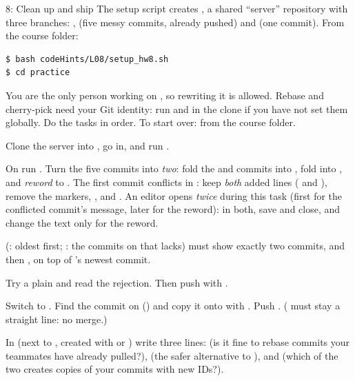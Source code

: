 \begin{homework}{8: Clean up and ship}
The setup script creates , a shared ``server'' repository with three branches: ,  (five messy commits, already pushed) and  (one commit). From the course folder:
\begin{lstlisting}
$ bash codeHints/L08/setup_hw8.sh
$ cd practice
\end{lstlisting}
You are the only person working on , so rewriting it is allowed. Rebase and cherry-pick need your Git identity: run  and  in the clone if you have not set them globally. Do the tasks in order. To start over:  from the course folder.

\begin{description}[leftmargin=1.2em,style=nextline]
\item[8.1 Look] Clone the server into , go in, and run .
\item[8.2 Tidy and rebase] On  run . Turn the five commits into \emph{two}: fold the  and  commits into , fold  into , and \emph{reword}  to . The first commit conflicts in : keep \emph{both} added lines ( and ), remove the markers, , and . An editor opens \emph{twice} during this task (first for the conflicted commit's message, later for the reword): in both, save and close, and change the text only for the reword.
\item[8.3 Check]  (: oldest first; : the commits on  that  lacks) must show exactly two commits,  and then , on top of 's newest commit.
\item[8.4 Publish] Try a plain  and read the rejection. Then push with .
\item[8.5 Cherry-pick] Switch to . Find the commit on  () and copy it onto  with . Push . ( must stay a straight line: no merge.)
\item[8.6 Questions] In  (next to , created with  or ) write three lines:  (is it fine to rebase commits your teammates have already pulled?),  (the safer alternative to ), and  (which of the two creates copies of your commits with new IDs?).
\end{description}


\end{homework}
